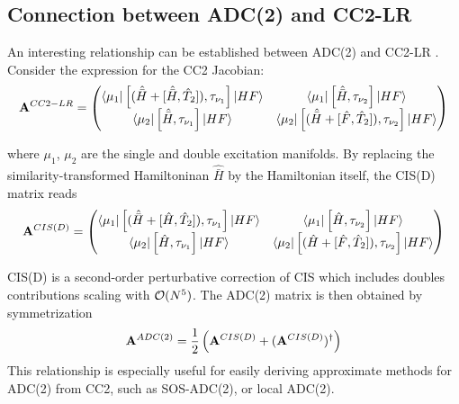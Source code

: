 
\subsection{Connection between ADC(2) and CC2-LR} 

An interesting relationship can be established between ADC(2) and CC2-LR \cite{Hf2005}. Consider the expression for the CC2 Jacobian:
\begin{equation}
\mathbf{A}^{CC2-LR} = \left( \begin{matrix}
\bra{\smash{\mu_1}} \left[ (\hat{\bar{H}} + \left[ \smash{ \hat{\bar{H}},\hat{T}_2} \right]), \tau_{\nu_1} \right] \ket{\smash{HF}} &  \bra{\smash{\mu_1}} \left[ \hat{\bar{H}}, \tau_{\nu_2} \right] \ket{\smash{HF}} \\
\bra{\smash{\mu_2}} \left[ \hat{\bar{H}}, \tau_{\nu_1} \right] \ket{\smash{HF}} & \bra{\smash{\mu_2}} \left[ (\hat{\bar{H}} + \left[ \smash{ \hat{F},\hat{T}_2} \right]), \tau_{\nu_2} \right] \ket{\smash{HF}}
\end{matrix}
\right)
\end{equation}

\noindent where $\mu_1$, $\mu_2$ are the single and double excitation manifolds. By replacing the similarity-transformed Hamiltoninan $\hat{\bar{H}}$ by the Hamiltonian itself, the CIS(D) matrix reads
\begin{equation}
\mathbf{A}^{CIS(D)} = \left( \begin{matrix}
\bra{\smash{\mu_1}} \left[ (\hat{\bar{H}} + \left[ \smash{ \hat{H},\hat{T}_2} \right]), \tau_{\nu_1} \right] \ket{\smash{HF}} &  \bra{\smash{\mu_1}} \left[ \hat{H}, \tau_{\nu_2} \right] \ket{\smash{HF}} \\
\bra{\smash{\mu_2}} \left[ \hat{H}, \tau_{\nu_1} \right] \ket{\smash{HF}} & \bra{\smash{\mu_2}} \left[ (\hat{H} + \left[ \smash{ \hat{F},\hat{T}_2} \right]), \tau_{\nu_2} \right] \ket{\smash{HF}}
\end{matrix}
\right)
\end{equation}

\noindent CIS(D) is a second-order perturbative correction of CIS which includes doubles contributions \cite{Hea1994} scaling with $\mathcal{O}(N^{5})$. The ADC(2) matrix is then obtained by symmetrization
\begin{equation}
\mathbf{A}^{ADC(2)} = \frac{1}{2} \left(\mathbf{A}^{CIS(D)} + (\mathbf{A}^{CIS(D)})^{\dagger} \right)
\end{equation}
\noindent This relationship is especially useful for easily deriving approximate methods for ADC(2) from CC2, such as SOS-ADC(2), or local ADC(2).


